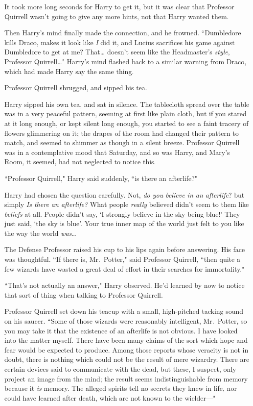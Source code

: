 It took more long seconds for Harry to get it, but it was clear that Professor Quirrell wasn't going to give any more hints, not that Harry wanted them.

Then Harry's mind finally made the connection, and he frowned. ``Dumbledore kills Draco, makes it look like \emph{I} did it, and Lucius sacrifices his game against Dumbledore to get at me? That{\ldots} doesn't seem like the Headmaster's \emph{style}, Professor Quirrell{\ldots}" Harry's mind flashed back to a similar warning from Draco, which had made Harry say the same thing.

Professor Quirrell shrugged, and sipped his tea.

Harry sipped his own tea, and sat in silence. The tablecloth spread over the table was in a very peaceful pattern, seeming at first like plain cloth, but if you stared at it long enough, or kept silent long enough, you started to see a faint tracery of flowers glimmering on it; the drapes of the room had changed their pattern to match, and seemed to shimmer as though in a silent breeze. Professor Quirrell was in a contemplative mood that Saturday, and so was Harry, and Mary's Room, it seemed, had not neglected to notice this.

``Professor Quirrell," Harry said suddenly, ``is there an afterlife?"

Harry had chosen the question carefully. Not, \emph{do you believe in an afterlife}? but simply \emph{Is there an afterlife?} What people \emph{really} believed didn't seem to them like \emph{beliefs} at all. People didn't say, `I strongly believe in the sky being blue!' They just said, `the sky is blue'. Your true inner map of the world just felt to you like the way the world \emph{was{\ldots}}

The Defense Professor raised his cup to his lips again before answering. His face was thoughtful. ``If there is, Mr.~Potter," said Professor Quirrell, ``then quite a few wizards have wasted a great deal of effort in their searches for immortality."

``That's not actually an answer," Harry observed. He'd learned by now to notice that sort of thing when talking to Professor Quirrell.

Professor Quirrell set down his teacup with a small, high-pitched tacking sound on his saucer. ``Some of those wizards were reasonably intelligent, Mr.~Potter, so you may take it that the existence of an afterlife is not obvious. I have looked into the matter myself. There have been many claims of the sort which hope and fear would be expected to produce. Among those reports whose veracity is not in doubt, there is nothing which could not be the result of mere wizardry. There are certain devices said to communicate with the dead, but these, I suspect, only project an image from the mind; the result seems indistinguishable from memory because it \emph{is} memory. The alleged spirits tell no secrets they knew in life, nor could have learned after death, which are not known to the wielder---"


